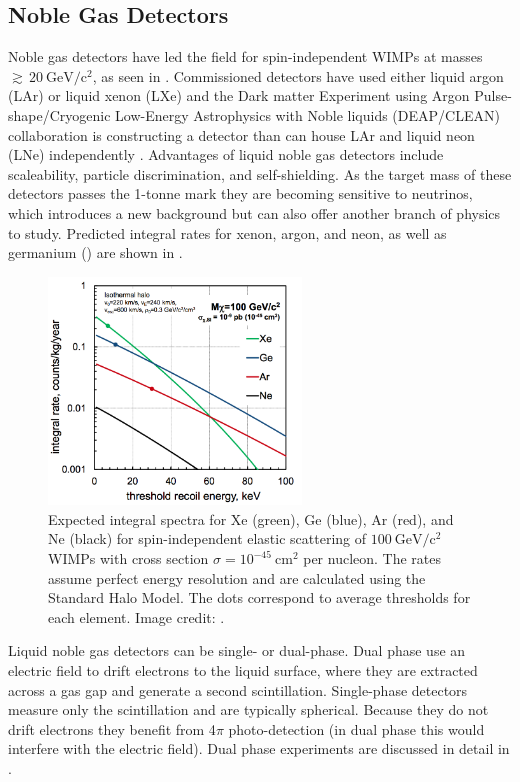 \subsection{Noble Gas Detectors} \label{subsec:noble_gas}
Noble gas detectors have led the field for spin-independent WIMPs at masses ${\gtrsim}\, 20\ \mathrm{GeV/c^2}$, as seen in
.  Commissioned detectors have used either liquid argon (LAr) or liquid xenon (LXe) and the
Dark matter Experiment using Argon Pulse-shape/Cryogenic Low-Energy Astrophysics with Noble liquids (DEAP/CLEAN) collaboration is
constructing a detector than can house
LAr and liquid neon (LNe) independently .  Advantages of liquid noble gas detectors
include scaleability, particle discrimination, and self-shielding.  As the target mass of these detectors passes
the 1-tonne mark they are becoming sensitive to neutrinos, which introduces a new background but can also offer another branch of physics
to study.  Predicted integral rates for xenon, argon, and neon, as well as germanium () are shown in
.

\begin{figure}
\centering
\includegraphics[width=0.6\textwidth]{IntegralRateTargets}
\caption{Expected integral spectra for Xe (green), Ge (blue), Ar (red), and Ne (black) for spin-independent elastic scattering of
$100\ \mathrm{GeV/c^2}$ WIMPs with
cross section $\sigma = 10^{-45}\ \mathrm{cm^{2}}$ per nucleon.  The rates assume perfect energy resolution and are calculated using the
Standard Halo Model.  The dots correspond to average thresholds for each element.  Image credit: .}
\label{fig:material_wimp_rate}
\end{figure}

Liquid noble gas detectors can be single- or dual-phase.  Dual phase use an electric field to drift electrons to the liquid surface, where
they are extracted across a gas gap and generate a second scintillation.  Single-phase detectors measure only the scintillation and are
typically
spherical.  Because they do not drift electrons they benefit from 4$\pi$ photo-detection (in dual phase this would interfere with the
electric field).  Dual phase experiments are discussed in detail in .

